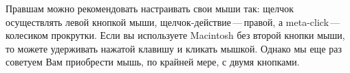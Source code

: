 \documentclass[a4paper,10pt,twoside]{book}
\begin{document}
\begin{description}
\end{description}










Правшам можно рекомендовать настраивать свои мыши так: щелчок
осуществлять левой кнопкой мыши, щелчок-действие\,---\,правой,
а meta-click\,---\,колесиком прокрутки.
Если вы используете Macintosh без второй кнопки мыши,
то можете удерживать нажатой клавишу и кликать мышкой.
Однако мы еще раз советуем Вам приобрести
мышь, по крайней мере, с двумя кнопками.
\end{document}
